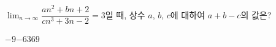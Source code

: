 $\displaystyle\lim_{n\to\infty}\dfrac{an^2+bn+2}{cn^3+3n-2}=3$일 때, 상수 $a$, $b$, $c$에 대하여 $a+b-c$의 값은?
\begin{choices32}{$-9$}{$-6$}{$3$}{$6$}{$9$}\end{choices32}
